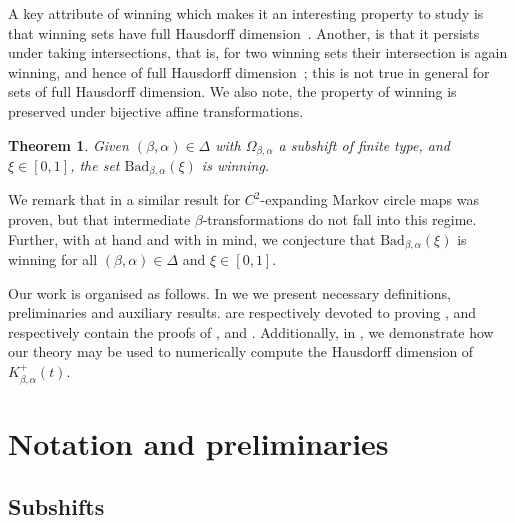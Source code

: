 \documentclass[a4paper,reqno,10pt]{amsart}
\newtheorem{theorem}{Theorem}[section]
\begin{document}
A key attribute of winning which makes it an interesting property to study is that winning sets have full Hausdorff dimension~\cite{S}. Another, is that it persists under taking intersections, that is, for two winning sets their intersection is again winning, and hence of full Hausdorff dimension~\cite{S}; this is not true in general for sets of full Hausdorff dimension.  We also note, the property of winning is preserved under bijective affine transformations.

    \begin{theorem}\label{thm:main_2}
        Given $(\beta, \alpha) \in \Delta$ with $\Omega_{\beta, \alpha}$ a subshift of finite type, and $\xi \in [0, 1]$, the set $\mathrm{Bad}_{\beta,\alpha}(\xi)$ is winning.
    \end{theorem}

We remark that in \cite{JT2009} a similar result for $C^{2}$-expanding Markov circle maps was proven, but that intermediate $\beta$-transformations do not fall into this regime. Further, with  at hand and with \cite[Theorem 1]{DavidFarm2010} in mind, we conjecture that $\mathrm{Bad}_{\beta,\alpha}(\xi)$ is winning for all $(\beta, \alpha) \in \Delta$ and $\xi \in [0, 1]$.

Our work is organised as follows. In  we we present necessary definitions, preliminaries and auxiliary results.  are respectively devoted to proving , and  respectively contain the proofs of , and . Additionally, in , we demonstrate how our theory may be used to numerically compute the Hausdorff dimension of $K_{\beta,\alpha}^{+}(t)$.

%
%
%
\section{Notation and preliminaries}\label{sec:prelim}
%
%
%

%
%
%
\subsection{Subshifts}
%
%
%
\end{document}
